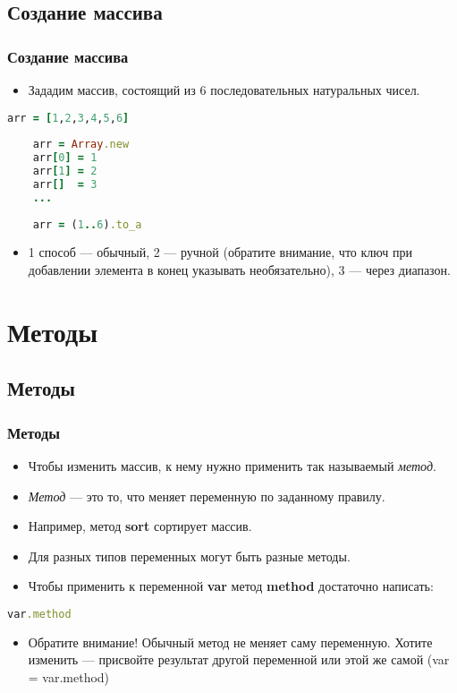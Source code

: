 \documentclass[compress,red]{beamer}
\begin{document}
\subsection{Создание массива}
\begin{frame}[fragile]
  \frametitle{Создание массива}
  
  \begin{itemize}
    \item Зададим массив, состоящий из 6 последовательных натуральных чисел.
  \end{itemize}
    \begin{lstlisting}[language=ruby,basicstyle=\footnotesize,label=ruby2,caption=Способы создания массива]
    arr = [1,2,3,4,5,6]
    
    arr = Array.new
    arr[0] = 1
    arr[1] = 2
    arr[]  = 3
    ...
    
    arr = (1..6).to_a
    \end{lstlisting}

  \begin{itemize}
    \item 1 способ --- обычный, 2 --- ручной (обратите внимание, что ключ при добавлении элемента в конец указывать необязательно), 3 --- через диапазон.
  \end{itemize}
  
\end{frame}

\section{Методы}
\subsection{Методы}
\begin{frame}[fragile]
  \frametitle{Методы}
  
  \begin{itemize}
    \item Чтобы изменить массив, к нему нужно применить так называемый \emph{метод}.
    \item \emph{Метод} --- это то, что меняет переменную по заданному правилу.
    \item Например, метод \textbf{sort} сортирует массив.
    \item Для разных типов переменных могут быть разные методы.
    \item Чтобы применить к переменной \textbf{var} метод \textbf{method} достаточно написать:
  \end{itemize}
  \begin{lstlisting}[language=ruby,basicstyle=\footnotesize,label=ruby3,caption=Применение метода]
    var.method
  \end{lstlisting}
  \begin{itemize}
    \item Обратите внимание! Обычный метод не меняет саму переменную. Хотите изменить --- присвойте результат другой переменной или этой же самой (var = var.method)
  \end{itemize}
  
\end{frame}
\end{document}
